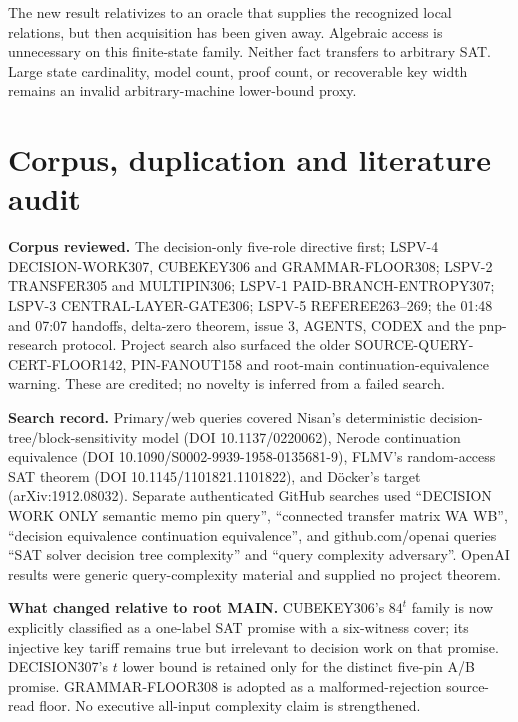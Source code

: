 \documentclass[11pt]{article}
\begin{document}
The new result relativizes to an oracle that supplies the recognized local relations, but then acquisition has been given away.  Algebraic access is unnecessary on this finite-state family.  Neither fact transfers to arbitrary SAT.  Large state cardinality, model count, proof count, or recoverable key width remains an invalid arbitrary-machine lower-bound proxy.

\section{Corpus, duplication and literature audit}
\sloppy
\textbf{Corpus reviewed.} The decision-only five-role directive first; LSPV-4 DECISION-WORK307, CUBEKEY306 and GRAMMAR-FLOOR308; LSPV-2 TRANSFER305 and MULTIPIN306; LSPV-1 PAID-BRANCH-ENTROPY307; LSPV-3 CENTRAL-LAYER-GATE306; LSPV-5 REFEREE263--269; the 01:48 and 07:07 handoffs, delta-zero theorem, issue 3, AGENTS, CODEX and the pnp-research protocol.  Project search also surfaced the older SOURCE-QUERY-CERT-FLOOR142, PIN-FANOUT158 and root-main continuation-equivalence warning.  These are credited; no novelty is inferred from a failed search.

\textbf{Search record.} Primary/web queries covered Nisan's deterministic decision-tree/block-sensitivity model (DOI 10.1137/0220062), Nerode continuation equivalence (DOI 10.1090/S0002-9939-1958-0135681-9), FLMV's random-access SAT theorem (DOI 10.1145/1101821.1101822), and D\"ocker's target (arXiv:1912.08032).  Separate authenticated GitHub searches used ``DECISION WORK ONLY semantic memo pin query'', ``connected transfer matrix WA WB'', ``decision equivalence continuation equivalence'', and github.com/openai queries ``SAT solver decision tree complexity'' and ``query complexity adversary''.  OpenAI results were generic query-complexity material and supplied no project theorem.

\textbf{What changed relative to root MAIN.} CUBEKEY306's $84^t$ family is now explicitly classified as a one-label SAT promise with a six-witness cover; its injective key tariff remains true but irrelevant to decision work on that promise.  DECISION307's $t$ lower bound is retained only for the distinct five-pin A/B promise.  GRAMMAR-FLOOR308 is adopted as a malformed-rejection source-read floor.  No executive all-input complexity claim is strengthened.
\end{document}
